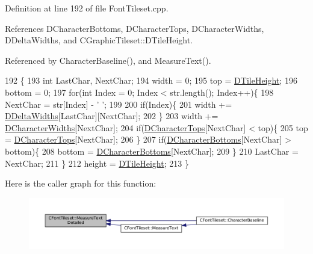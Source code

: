 Definition at line 192 of file Font\+Tileset.\+cpp.



References D\+Character\+Bottoms, D\+Character\+Tops, D\+Character\+Widths, D\+Delta\+Widths, and C\+Graphic\+Tileset\+::\+D\+Tile\+Height.



Referenced by Character\+Baseline(), and Measure\+Text().


\begin{DoxyCode}
192                                                                                                            
         \{
193     \textcolor{keywordtype}{int} LastChar, NextChar;
194     width = 0;
195     top = \hyperlink{classCGraphicTileset_af48f32e07d5fe69afd5f764318cc3244}{DTileHeight};
196     bottom = 0;
197     \textcolor{keywordflow}{for}(\textcolor{keywordtype}{int} Index = 0; Index < str.length(); Index++)\{
198         NextChar = str[Index] - \textcolor{charliteral}{' '};
199         
200         \textcolor{keywordflow}{if}(Index)\{
201             width += \hyperlink{classCFontTileset_a1e253853e14282e9582a7f47dace8f70}{DDeltaWidths}[LastChar][NextChar]; 
202         \}
203         width += \hyperlink{classCFontTileset_ad25347b5350a8380be8c550d9f2e2798}{DCharacterWidths}[NextChar]; 
204         \textcolor{keywordflow}{if}(\hyperlink{classCFontTileset_aa009ebe41a491d854a5f6005919649c2}{DCharacterTops}[NextChar] < top)\{
205             top = \hyperlink{classCFontTileset_aa009ebe41a491d854a5f6005919649c2}{DCharacterTops}[NextChar];   
206         \}
207         \textcolor{keywordflow}{if}(\hyperlink{classCFontTileset_a13d7063022d59bf3347452c78be50a8b}{DCharacterBottoms}[NextChar] > bottom)\{
208             bottom = \hyperlink{classCFontTileset_a13d7063022d59bf3347452c78be50a8b}{DCharacterBottoms}[NextChar];   
209         \}
210         LastChar = NextChar;
211     \}
212     height = \hyperlink{classCGraphicTileset_af48f32e07d5fe69afd5f764318cc3244}{DTileHeight};
213 \}
\end{DoxyCode}
Here is the caller graph for this function\+:\nopagebreak
\begin{figure}[H]
\begin{center}
\leavevmode
\includegraphics[width=350pt]{classCFontTileset_a7afa08157a6bea6c0fbd06299685b8b3_icgraph}
\end{center}
\end{figure}


